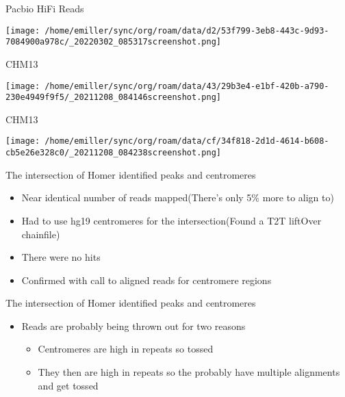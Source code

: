 \documentclass[bigger]{beamer}
\begin{document}
\begin{frame}[label={sec:org12e7616}]{Pacbio HiFi Reads}
\begin{center}
\texttt{[image: /home/emiller/sync/org/roam/data/d2/53f799-3eb8-443c-9d93-7084900a978c/\_20220302\_085317screenshot.png]}
\end{center}
\end{frame}



\begin{frame}[label={sec:org11e8632}]{CHM13}
\begin{center}
\texttt{[image: /home/emiller/sync/org/roam/data/43/29b3e4-e1bf-420b-a790-230e4949f9f5/\_20211208\_084146screenshot.png]}
\end{center}
\end{frame}

\begin{frame}[label={sec:org774206d}]{CHM13}
\begin{center}
\texttt{[image: /home/emiller/sync/org/roam/data/cf/34f818-2d1d-4614-b608-cb5e26e328c0/\_20211208\_084238screenshot.png]}
\end{center}
\end{frame}


\begin{frame}[label={sec:org17b70ef}]{The intersection of Homer identified peaks and centromeres}
\begin{itemize}
\item Near identical number of reads mapped(There's only 5\% more to align to)
\item Had to use hg19 centromeres for the intersection(Found a T2T liftOver
chainfile)
\item There were no hits
\item Confirmed with call to aligned reads for centromere regions
\end{itemize}
\end{frame}

\begin{frame}[label={sec:orgcb70037}]{The intersection of Homer identified peaks and centromeres}
\begin{itemize}
\item Reads are probably being thrown out for two reasons
\begin{itemize}
\item Centromeres are high in repeats so tossed
\item They then are high in repeats so the probably have multiple alignments and
get tossed
\end{itemize}
\end{itemize}
\end{frame}
\end{document}
